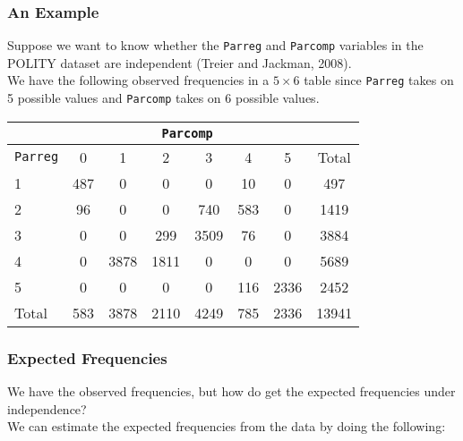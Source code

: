 \documentclass{beamer}
\begin{document}
\begin{frame}
\frametitle{An Example}
Suppose we want to know whether the {\tt Parreg} and
{\tt Parcomp} variables in the POLITY dataset are independent (Treier
and Jackman, 2008).\\
\pause
\bigskip
We have the following observed frequencies in a $5 \times 6$ table
since {\tt Parreg} takes on 5 possible values and {\tt Parcomp} takes
on 6 possible values.
\pause
\footnotesize
\begin{table}
\begin{center}
\begin{tabular}{l|cccccc|c}
& \multicolumn{6}{c}{{\tt Parcomp}} & \\
\hline
{\tt Parreg} & 0 & 1 & 2 & 3 & 4 & 5 & Total\\
\hline
1 & 487 & 0 & 0 & 0 & 10 & 0 & 497 \\
2 & 96 & 0 & 0 & 740 & 583 & 0 & 1419\\
3 & 0 & 0 & 299 & 3509 & 76 & 0 & 3884\\
4 & 0 & 3878 & 1811 & 0 & 0 & 0 & 5689\\
5 & 0 & 0 & 0 & 0 & 116 & 2336 & 2452\\
\hline
Total & 583 & 3878 & 2110 & 4249 & 785 & 2336 & 13941\\
\end{tabular}
\end{center}
\end{table}
\normalsize
\end{frame}

\begin{frame}
\frametitle{Expected Frequencies}
\pause
We have the observed frequencies, but how do get the expected
frequencies under independence? \\
\bigskip
\pause
We can estimate the expected frequencies from the data by doing the following:\\
\end{frame}
\end{document}
